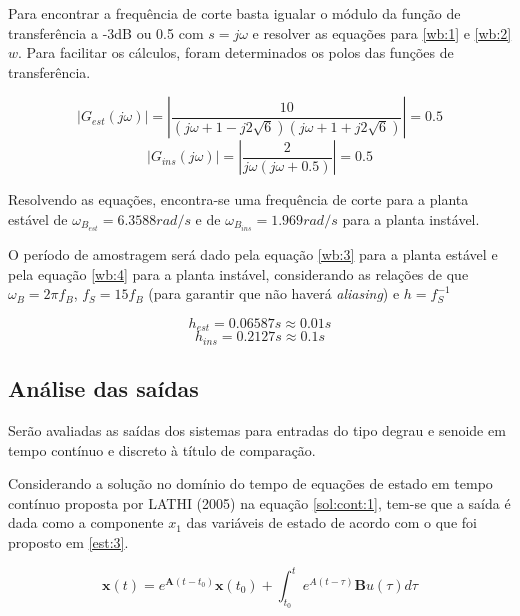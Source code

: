 Para encontrar a frequência de corte basta igualar o módulo da função de transferência a -3dB ou 0.5 com $s = j\omega$ e resolver as equações para \ref{wb:1} e \ref{wb:2} $w$. Para facilitar os cálculos, foram determinados os polos das funções de transferência.

\begin{equation} \label{wb:1}
    |G_{est}(j\omega)| = \left |\frac{10}{(j\omega +1-j2\sqrt{6})(j\omega +1+j2\sqrt{6})} \right| = 0.5 
\end{equation}
\begin{equation} \label{wb:2}
    |G_{ins}(j\omega)| = \left |\frac{2}{j\omega(j\omega+0.5)} \right| = 0.5 
\end{equation}

Resolvendo as equações, encontra-se uma frequência de corte para a planta estável de $\omega_{B_{est}} = 6.3588 rad/s$ e de $\omega_{B_{ins}} =  1.969 rad/s$ para a planta instável. 

O período de amostragem será dado pela equação \ref{wb:3} para a planta estável e pela equação \ref{wb:4} para a planta instável, considerando as relações de que $\omega_B = 2\pi f_B$, $f_S = 15f_B$ (para garantir que não haverá \textit{aliasing}) e $h = f_S^{-1}$

\begin{equation} \label{wb:3}
    h_{est} = 0.06587 s \approx 0.01 s 
\end{equation}
\begin{equation} \label{wb:4}
    h_{ins} = 0.2127 s \approx 0.1 s 
\end{equation}

\subsection{Análise das saídas}

Serão avaliadas as saídas dos sistemas para entradas do tipo degrau e senoide em tempo contínuo e discreto à título de comparação.

Considerando a solução no domínio do tempo de equações de estado em tempo contínuo proposta por LATHI (2005) na equação \ref{sol:cont:1}, tem-se que a saída é dada como a componente $x_1$ das variáveis de estado de acordo com o que foi proposto em \ref{est:3}.

\begin{equation} \label{sol:cont:1}
    \textbf{x}(t)= e^{\textbf{A}(t-t_0)}\textbf{x}(t_0) + \int_{t_0}^{t} e^{A(t-\tau)}\textbf{B}u(\tau) d\tau
\end{equation}

